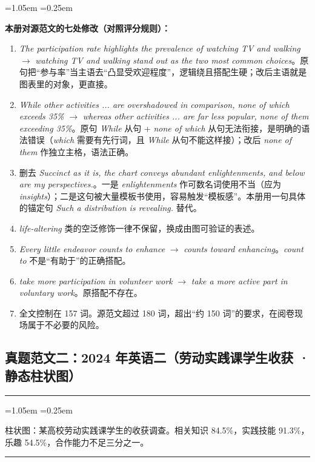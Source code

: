 \documentclass[11pt,a4paper]{ctexart}
\newcommand{\en}[1]{\textit{#1}}
\newenvironment{tpl}[1]{%
  \par\addvspace{7pt}\needspace{4\baselineskip}%
  \noindent{\bfseries\color{accent}#1}\par\nopagebreak
  \vspace{2pt}\noindent\rule{\linewidth}{0.7pt}\par\nopagebreak\vspace{3pt}%
  \begin{list}{}{\leftmargin=1.05em \rightmargin=0.25em \listparindent=0pt
    \itemindent=0pt \topsep=0pt \parsep=2.5pt \itemsep=2.5pt \partopsep=0pt}%
  \item\relax
}{%
  \end{list}\vspace{1pt}\noindent\rule{\linewidth}{0.7pt}\par\addvspace{8pt}%
}
\newenvironment{note}{%
  \par\addvspace{5pt}%
  \begin{list}{}{\leftmargin=1.05em \rightmargin=0.25em \listparindent=0pt
    \itemindent=0pt \topsep=0pt \parsep=2pt \itemsep=2pt \partopsep=0pt}%
  \item\relax\small\color{ink}%
}{%
  \end{list}\addvspace{5pt}%
}
\begin{document}
\begin{note}
\textbf{本册对源范文的七处修改（对照评分规则）：}
\begin{enumerate}[leftmargin=1.7em,itemsep=1.5pt,topsep=2pt]
\item \en{The participation rate highlights the prevalence of watching TV and walking} $\rightarrow$ \en{watching TV and walking stand out as the two most common choices}。原句把“参与率”当主语去“凸显受欢迎程度”，逻辑绕且搭配生硬；改后主语就是图表里的对象，更直接。
\item \en{While other activities ... are overshadowed in comparison, none of which exceeds 35\%} $\rightarrow$ \en{whereas other activities ... are far less popular, none of them exceeding 35\%}。原句 \en{While} 从句 + \en{none of which} 从句无法衔接，是明确的语法错误（\en{which} 需要有先行词，且 \en{While} 从句不能这样接）；改后 \en{none of them} 作独立主格，语法正确。
\item 删去 \en{Succinct as it is, the chart conveys abundant enlightenments, and below are my perspectives.}。一是 \en{enlightenments} 作可数名词使用不当（应为 \en{insights}）；二是这句被大量模板书使用，容易触发“模板感”。本册用一句具体的锚定句 \en{Such a distribution is revealing.} 替代。
\item \en{life-altering} 类的空泛修饰一律不保留，换成由图可验证的表述。
\item \en{Every little endeavor counts to enhance} $\rightarrow$ \en{counts toward enhancing}。\en{count to} 不是“有助于”的正确搭配。
\item \en{take more participation in volunteer work} $\rightarrow$ \en{take a more active part in voluntary work}。原搭配不存在。
\item 全文控制在 157 词。源范文超过 180 词，超出“约 150 词”的要求，在阅卷现场属于不必要的风险。
\end{enumerate}
\end{note}

\subsection{真题范文二：2024 年英语二（劳动实践课学生收获 · 静态柱状图）}

\begin{tpl}{题目要点}
柱状图：某高校劳动实践课学生的收获调查。相关知识 84.5\%，实践技能 91.3\%，乐趣 54.5\%，合作能力不足三分之一。
\end{tpl}
\end{document}
